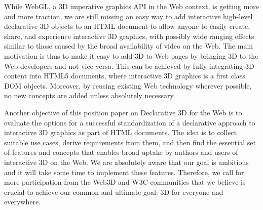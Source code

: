 \documentclass{acmsiggraph}
\begin{document}
While WebGL, a 3D imperative graphics API in the Web context, is getting more and more traction, we are still missing an easy way to add interactive high-level declarative 3D objects to an HTML document to allow anyone to easily create, share, and experience interactive 3D graphics, with possibly wide ranging effects similar to those caused by the broad availability of video on the Web.
The main motivation is thus to make it easy to add 3D to Web pages by bringing 3D to the Web developers and not vice versa. This can be achieved by fully integrating 3D content into HTML5 documents, where interactive 3D graphics is a first class DOM objects. Moreover, by reusing existing Web technology wherever possible, no new concepts are added unless absolutely necessary.

Another objective of this position paper on Declarative 3D for the Web is to evaluate the options for a successful standardization of a declarative approach to interactive 3D graphics as part of HTML documents. The idea is to collect suitable use cases, derive requirements from them, and then find the essential set of features and concepts that enables broad uptake by authors and users of interactive 3D on the Web.
We are absolutely aware that our goal is ambitious and it will take some time to implement these features. Therefore, we call for more participation from the Web3D and W3C communities that we believe is crucial to achieve our common and ultimate goal: 3D for everyone and everywhere.





\end{document}
